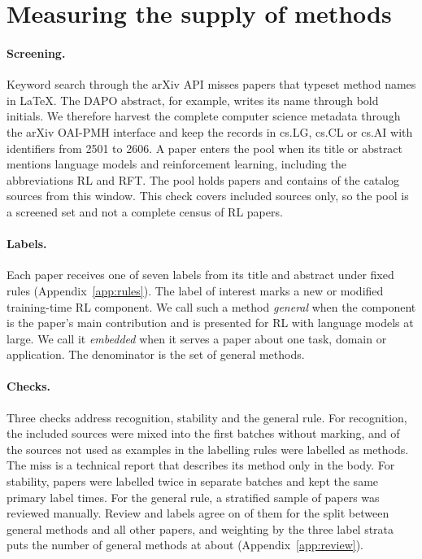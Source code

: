 \documentclass{article}
\begin{document}
\section{Measuring the supply of methods}
\label{sec:supply}

\paragraph{Screening.} Keyword search through the arXiv API misses papers that typeset method names in LaTeX. The DAPO abstract, for example, writes its name through bold initials. We therefore harvest the complete computer science metadata through the arXiv OAI-PMH interface and keep the \NHarvest{} records in cs.LG, cs.CL or cs.AI with identifiers from 2501 to 2606. A paper enters the pool when its title or abstract mentions language models and reinforcement learning, including the abbreviations RL and RFT. The pool holds \NPool{} papers and contains \NCatalogInPool{} of the \NCatalogInWindow{} catalog sources from this window. This check covers included sources only, so the pool is a screened set and not a complete census of RL papers.

\paragraph{Labels.} Each paper receives one of seven labels from its title and abstract under fixed rules (Appendix~\ref{app:rules}). The label of interest marks a new or modified training-time RL component. We call such a method \emph{general} when the component is the paper's main contribution and is presented for RL with language models at large. We call it \emph{embedded} when it serves a paper about one task, domain or application. The denominator is the set of general methods.

\paragraph{Checks.} Three checks address recognition, stability and the general rule. For recognition, the included sources were mixed into the first batches without marking, and \RecallCleanHit{} of the \RecallCleanAll{} sources not used as examples in the labelling rules were labelled as methods. The miss is a technical report that describes its method only in the body. For stability, \RepeatAll{} papers were labelled twice in separate batches and kept the same primary label \RepeatAgree{} times. For the general rule, a stratified sample of \ReviewAll{} papers was reviewed manually. Review and labels agree on \ReviewAgree{} of them for the split between general methods and all other papers, and weighting by the three label strata puts the number of general methods at about \ReviewEstimate{} (Appendix~\ref{app:review}).
\end{document}
